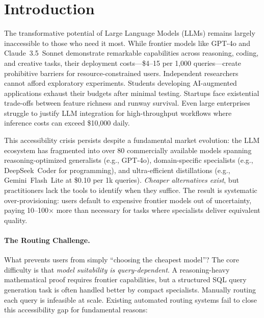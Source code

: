 
\section{Introduction}
\label{sec:introduction}

The transformative potential of Large Language Models (LLMs) remains largely inaccessible to those who need it most. While frontier models like GPT-4o and Claude~3.5~Sonnet demonstrate remarkable capabilities across reasoning, coding, and creative tasks, their deployment costs---\$4--15 per 1,000 queries---create prohibitive barriers for resource-constrained users. Independent researchers cannot afford exploratory experiments. Students developing AI-augmented applications exhaust their budgets after minimal testing. Startups face existential trade-offs between feature richness and runway survival. Even large enterprises struggle to justify LLM integration for high-throughput workflows where inference costs can exceed \$10,000 daily.

This accessibility crisis persists despite a fundamental market evolution: the LLM ecosystem has fragmented into over 80 commercially available models spanning reasoning-optimized generalists (e.g., GPT-4o), domain-specific specialists (e.g., DeepSeek~Coder for programming), and ultra-efficient distillations (e.g., Gemini~Flash~Lite at \$0.10 per 1k queries). \emph{Cheaper alternatives exist}, but practitioners lack the tools to identify when they suffice. The result is systematic over-provisioning: users default to expensive frontier models out of uncertainty, paying 10--100× more than necessary for tasks where specialists deliver equivalent quality.

\paragraph{The Routing Challenge.} What prevents users from simply ``choosing the cheapest model''? The core difficulty is that \emph{model suitability is query-dependent}. A reasoning-heavy mathematical proof requires frontier capabilities, but a structured SQL query generation task is often handled better by compact specialists. Manually routing each query is infeasible at scale. Existing automated routing systems fail to close this accessibility gap for fundamental reasons:

